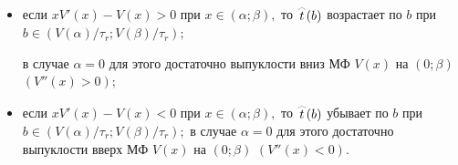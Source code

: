 \begin{theorem}[2]
\begin{enumerate}
\begin{itemize}

\item[--]  если $xV'(x)-V(x)>0$ при $x\in(\alpha;\beta),$ то $\mathord{\buildrel{\lower3pt\hbox{$\scriptscriptstyle\frown$}}\over{t}}(b)$ возрастает по $b$ при $b\in(V(\alpha)/\tau_r;V(\beta)/\tau_r);$ 

в случае $\alpha=0$ для этого достаточно выпуклости вниз МФ $V(x)$ на $(0;\beta)$ $(V''(x)>0);$ 

\item[--] если $xV'(x)-V(x)<0$ при $x\in(\alpha;\beta),$ то $\mathord{\buildrel{\lower3pt\hbox{$\scriptscriptstyle\frown$}}\over{t}}(b)$ убывает по $b$ при $b\in(V(\alpha)/\tau_r;V(\beta)/\tau _r);$ в случае $\alpha=0$ для этого достаточно выпуклости вверх МФ $V(x)$ на $(0;\beta)$ $(V''(x)<0).$ 

\end{itemize}

\end{enumerate}

\end{theorem}



\smallskip



